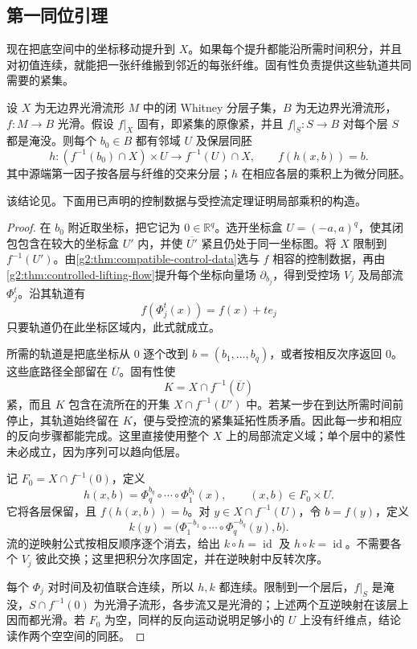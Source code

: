 \subsection{第一同位引理}
\label{g2:subsec:B02:03}

现在把底空间中的坐标移动提升到 \(X\)。如果每个提升都能沿所需时间积分，并且对初值连续，就能把一张纤维搬到邻近的每张纤维。固有性负责提供这些轨道共同需要的紧集。

\begin{theorem}[第一同位引理]\label{g2:thm:first-isotopy-lemma}
	设 \(X\) 为无边界光滑流形 \(M\) 中的闭 Whitney 分层子集，\(B\) 为无边界光滑流形，\(f:M\to B\) 光滑。假设 \(f|_X\) 固有，即紧集的原像紧，并且 \(f|_S:S\to B\) 对每个层 \(S\) 都是淹没。则每个 \(b_0\in B\) 都有邻域 \(U\) 及保层同胚
	\begin{equation}\label{g2:eq:first-isotopy-trivialization}
		h:(f^{-1}(b_0)\cap X)\times U\longrightarrow f^{-1}(U)\cap X,
		\qquad f(h(x,b))=b.
	\end{equation}
	其中源端第一因子按各层与纤维的交来分层；\(h\) 在相应各层的乘积上为微分同胚。
\end{theorem}

该结论见\cite[第11节，第一同位引理]{Mather2012TopologicalStability}。下面用已声明的控制数据与受控流定理证明局部乘积的构造。

\begin{proof}
	在 \(b_0\) 附近取坐标，把它记为 \(0\in\mathbb R^q\)。选开坐标盒 \(U=(-a,a)^q\)，使其闭包包含在较大的坐标盒 \(U'\) 内，并使 \(\overline{U'}\) 紧且仍处于同一坐标图。将 \(X\) 限制到 \(f^{-1}(U')\)。由\cref{g2:thm:compatible-control-data}选与 \(f\) 相容的控制数据，再由\cref{g2:thm:controlled-lifting-flow}提升每个坐标向量场 \(\partial_{b_j}\)，得到受控场 \(V_j\) 及局部流 \(\Phi_j^t\)。沿其轨道有
	\[
		f(\Phi_j^t(x))=f(x)+t e_j
	\]
	只要轨道仍在此坐标区域内，此式就成立。

	所需的轨道是把底坐标从 \(0\) 逐个改到 \(b=(b_1,\ldots,b_q)\)，或者按相反次序返回 \(0\)。这些底路径全部留在 \(\overline U\)。固有性使
	\[
		K=X\cap f^{-1}(\overline U)
	\]
	紧，而且 \(K\) 包含在流所在的开集 \(X\cap f^{-1}(U')\) 中。若某一步在到达所需时间前停止，其轨道始终留在 \(K\)，便与受控流的紧集延拓性质矛盾。因此每一步和相应的反向步骤都能完成。这里直接使用整个 \(X\) 上的局部流定义域；单个层中的紧性未必成立，因为序列可以趋向低层。

	记 \(F_0=X\cap f^{-1}(0)\)，定义
	\[
		h(x,b)=\Phi_q^{b_q}\circ\cdots\circ\Phi_1^{b_1}(x),
		\qquad (x,b)\in F_0\times U.
	\]
	它将各层保留，且 \(f(h(x,b))=b\)。对 \(y\in X\cap f^{-1}(U)\)，令 \(b=f(y)\)，定义
	\[
		k(y)=\bigl(\Phi_1^{-b_1}\circ\cdots\circ\Phi_q^{-b_q}(y),b\bigr).
	\]
	流的逆映射公式按相反顺序逐个消去，给出 \(k\circ h=\operatorname{id}\) 及 \(h\circ k=\operatorname{id}\)。不需要各个 \(V_j\) 彼此交换；这里把积分次序固定，并在逆映射中反转次序。

	每个 \(\Phi_j\) 对时间及初值联合连续，所以 \(h,k\) 都连续。限制到一个层后，\(f|_S\) 是淹没，\(S\cap f^{-1}(0)\) 为光滑子流形，各步流又是光滑的；上述两个互逆映射在该层上因而都光滑。若 \(F_0\) 为空，同样的反向运动说明足够小的 \(U\) 上没有纤维点，结论读作两个空空间的同胚。
\end{proof}

